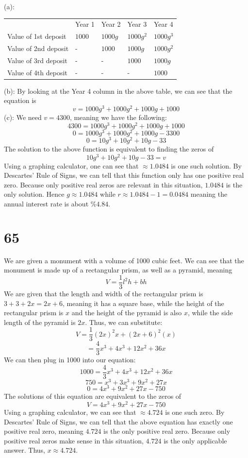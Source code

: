 \documentclass{article}
\theoremstyle{definition}
\begin{document}
(a):
\begin{center}
	\begin{tabular}{l|l|l|l|l}
		& Year 1 & Year 2 & Year 3 & Year 4 \\
		Value of 1st deposit & $1000$ & $1000g$ & $1000g^2$ & $1000g^3$ \\
		Value of 2nd deposit & - & $1000$ & $1000g$ & $1000g^2$ \\
		Value of 3rd deposit & - & - & $1000$ & $1000g$ \\
		Value of 4th deposit & - & - & - & $1000$
	\end{tabular}
\end{center}
(b): By looking at the Year 4 column in the above table, we can see that the equation is \[ v=1000g^3+1000g^2+1000g+1000 \]
(c): We need $v=4300$, meaning we have the following:
\[ 4300=1000g^3+1000g^2+1000g+1000 \]
\[ 0=1000g^3+1000g^2+1000g-3300 \]
\[ 0=10g^3+10g^2+10g-33 \]
The solution to the above function is equivalent to finding the zeros of \[ 10g^3+10g^2+10g-33=v \] Using a graphing calculator, one can see that 
$\approx 1.0484$ is one such solution. By Descartes' Rule of Signs, we can tell that this function only has one positive real zero. Because only positive 
real zeros are relevant in this situation, $1.0484$ is the only solution. Hence $g\approx 1.0484$ while $r\approx 1.0484-1=0.0484$ meaning the annual 
interest rate is about $\%4.84$.

\section*{65}


We are given a monument with a volume of 1000 cubic feet. We can see that the monument is made up of a rectangular prism, as well as a 
pyramid, meaning
\[ V=\frac{1}{3}l^2h+bh \] 
We are given that the length and width of the rectangular prism is $3+3+2x=2x+6$, meaning it has a square base, 
while the height of the rectangular prism is $x$ and the height of the 
pyramid is also $x$, while the side length of the pyramid is $2x$. Thus, we can substitute:
\[ V=\frac{1}{3}(2x)^2x+(2x+6)^2(x) \]
\[ =\frac{4}{3}x^3+4x^3+12x^2+36x \]
We can then plug in 1000 into our equation:
\[ 1000=\frac{4}{3}x^3+4x^3+12x^2+36x \]
\[ 750=x^3+3x^3+9x^2+27x \]
\[ 0=4x^3+9x^2+27x-750 \]
The solutions of this equation are equivalent to the zeros of 
\[ V=4x^3+9x^2+27x-750 \]
Using a graphing calculator, we can see that $\approx 4.724$ is one such zero. By Descartes' Rule of Signs, we can tell that the above 
equation has exactly one positive real zero, meaning $4.724$ is the only positive real zero. 
Because only positive real zeros make sense in this situation, $4.724$ is the only applicable 
answer. Thus, $x\approx 4.724$.
\end{document}
